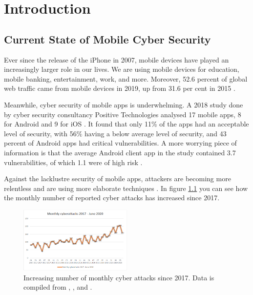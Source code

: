 \chapter{Introduction}
	\label{chap:intro}
	
	\section{Current State of Mobile Cyber Security}
		\label{sec:intro_motivation} 
		
		Ever since the release of the iPhone in 2007, mobile devices have played an increasingly larger role in our lives. We are using mobile devices for education, mobile banking, entertainment, work, and more. Moreover, 52.6 percent of global web traffic came from mobile devices in 2019, up from 31.6 per cent in 2015 \cite{statista_mobile_web_traffic}. 
		
		Meanwhile, cyber security of mobile apps is underwhelming. A 2018 study done by cyber security consultancy Positive Technologies analysed 17 mobile apps, 8 for Android and 9 for iOS \cite{pt_mobile_apps_2019}. It found that only 11\% of the apps had an acceptable level of security, with 56\% having a below average level of security, and 43 percent of Android apps had critical vulnerabilities. A more worrying piece of information is that the average Android client app in the study contained 3.7 vulnerabilities, of which 1.1 were of high risk \cite{pt_mobile_apps_2019}.
		
		Against the lacklustre security of mobile apps, attackers are becoming more relentless and are using more elaborate techniques \cite{pt_threatscape_2018}. In figure \ref{fig:no_attacks_evolution} you can see how the monthly number of reported cyber attacks has increased since 2017.
		
		\begin{figure}[h]
            \centering
            \includegraphics[width=0.5\textwidth]{graphics/threatscape_chart.PNG}
            \caption{Increasing number of monthly cyber attacks since 2017. Data is compiled from \cite{pt_threatscape_2018}, \cite{pt_threatscape_2019}, \cite{pt_threatscape_2020} and              \cite{pt_threatscape_2020q2}.}
            \label{fig:no_attacks_evolution}
        \end{figure}
		
